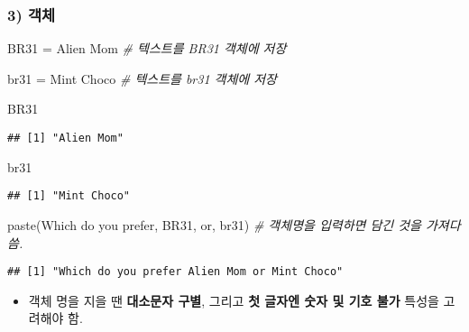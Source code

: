 \documentclass[
  12,
]{article}
\newenvironment{Shaded}{\begin{snugshade}}{\end{snugshade}}
\newcommand{\CommentTok}[1]{\textcolor[rgb]{0.56,0.35,0.01}{\textit{#1}}}
\newcommand{\FunctionTok}[1]{\textcolor[rgb]{0.00,0.00,0.00}{#1}}
\newcommand{\NormalTok}[1]{#1}
\newcommand{\OtherTok}[1]{\textcolor[rgb]{0.56,0.35,0.01}{#1}}
\newcommand{\StringTok}[1]{\textcolor[rgb]{0.31,0.60,0.02}{#1}}
\providecommand{\tightlist}{%
  \setlength{\itemsep}{0pt}\setlength{\parskip}{0pt}}
\begin{document}
\hypertarget{uxac1duxccb4}{%
\subsubsection{3) 객체}\label{uxac1duxccb4}}

\begin{Shaded}
\begin{Highlighting}[]
\NormalTok{BR31 }\OtherTok{=} \StringTok{\textquotesingle{}Alien Mom\textquotesingle{}} \CommentTok{\# 텍스트를 BR31 객체에 저장}

\NormalTok{br31 }\OtherTok{=} \StringTok{\textquotesingle{}Mint Choco\textquotesingle{}} \CommentTok{\# 텍스트를 br31 객체에 저장}
\end{Highlighting}
\end{Shaded}

\begin{Shaded}
\begin{Highlighting}[]
\NormalTok{BR31}
\end{Highlighting}
\end{Shaded}

\begin{verbatim}
## [1] "Alien Mom"
\end{verbatim}

\begin{Shaded}
\begin{Highlighting}[]
\NormalTok{br31}
\end{Highlighting}
\end{Shaded}

\begin{verbatim}
## [1] "Mint Choco"
\end{verbatim}

\begin{Shaded}
\begin{Highlighting}[]
\FunctionTok{paste}\NormalTok{(}\StringTok{\textquotesingle{}Which do you prefer\textquotesingle{}}\NormalTok{, BR31, }\StringTok{\textquotesingle{}or\textquotesingle{}}\NormalTok{, br31) }\CommentTok{\# 객체명을 입력하면 담긴 것을 가져다 씀.}
\end{Highlighting}
\end{Shaded}

\begin{verbatim}
## [1] "Which do you prefer Alien Mom or Mint Choco"
\end{verbatim}

\begin{itemize}
\tightlist
\item
  객체 명을 지을 땐 \textbf{대소문자 구별}, 그리고 \textbf{첫 글자엔
  숫자 및 기호 불가} 특성을 고려해야 함.
\end{itemize}
\end{document}
